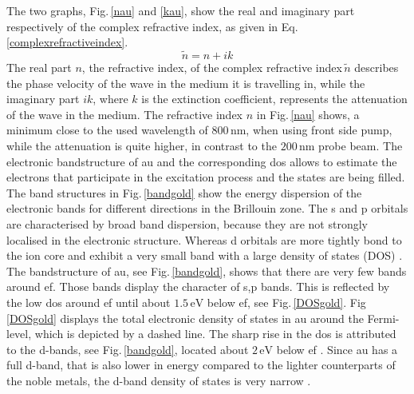 \documentclass[a4paper,12pt,twoside]{article}
\begin{document}
\noindent
%
%
%
The two graphs, Fig.\,\ref{nau} and \ref{kau}, show the real and imaginary part respectively of the complex refractive index, as given in Eq.\,\ref{complexrefractiveindex}.
    \begin{equation}
        \label{complexrefractiveindex}
        \tilde{n} = n + ik
    \end{equation}
The real part $n$, the refractive index, of the complex refractive index\,$\tilde{n}$ describes the phase velocity of the wave in the medium it is travelling in, while the imaginary part $ik$, where $k$ is the extinction coefficient, represents the attenuation of the wave in the medium. The refractive index $n$ in Fig.\,\ref{nau} shows, a minimum close to the used wavelength of $800\,\mathrm{nm}$, when using front side pump, while the attenuation is quite higher, in contrast to the $200\,\mathrm{nm}$ probe beam.
The electronic bandstructure of \gls{au} and the corresponding \gls{dos} allows to estimate the electrons that participate in the excitation process and the states are being filled. The band structures in Fig.\,\ref{bandgold} show the energy dispersion of the electronic bands for different directions in the Brillouin zone. The s and p orbitals are characterised by broad band dispersion, because they are not strongly localised in the electronic structure. Whereas d orbitals are more tightly bond to the ion core and exhibit a very small band with a large density of states (DOS) \cite{H.Ibach2008}. The bandstructure of \gls{au}, see Fig.\,\ref{bandgold}, shows that there are very few bands around \gls{ef}. Those bands display the character of s,p bands. This is reflected by the low \gls{dos} around \gls{ef} until about $1.5\,\mathrm{eV}$ below \gls{ef}, see Fig.\,\ref{DOSgold}. Fig\,\ref{DOSgold} displays the total electronic density of states in \gls{au} around the Fermi-level, which is depicted by a dashed line. The sharp rise in the \gls{dos} is attributed to the d-bands, see Fig.\,\ref{bandgold}, located about $2\,\mathrm{eV}$ below \gls{ef} \cite{Beckord2018}. Since \gls{au} has a full d-band, that is also lower in energy compared to the lighter counterparts of the noble metals, the d-band density of states is very narrow \cite{Nature1995}.
	
\end{document}
